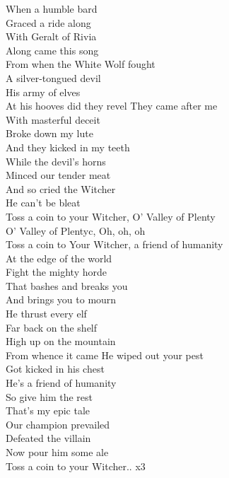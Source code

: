 
When a humble bard \tab{}\\
Graced a ride along \tab{}\\
With Geralt of Rivia \tab{}\\
Along came this  song \tab{}\\
From when the White Wolf fought\\
A silver-tongued devil\tab{}\\
His army of elves \tab{}\\
At his hooves did they  revel \tab{}\hop
They came after me\tab{}\\
With masterful deceit\tab{}\\
Broke down my lute \tab{}\\
And they kicked in my teeth \tab{}\\
While the devil’s horns\tab{}\\
Minced our tender meat\tab{}\\
And so cried the Witcher \tab{}\\
He can’t be bleat \tab{}\\
 \hops
{} Toss a coin to your Witcher, O’ Valley of Plenty \\
 O’ Valley of Plentyc, Oh, oh, oh \tab{}\\
 Toss a coin to Your Witcher, a friend of humanity \\
\hops
At the edge of the world\\
Fight the mighty horde\\
That bashes and breaks you\\
And brings you to mourn \\
He thrust every elf\\
Far back on the shelf\\
High up on the mountain\\
From whence it came \hop
He wiped out your pest\\
Got kicked in his chest\\
He’s a friend of humanity\\
So give him the rest\\
That’s my epic tale\\
Our champion prevailed\\
Defeated the villain\\
Now pour him some ale\\
\hops
{} Toss a coin to your Witcher.. x3